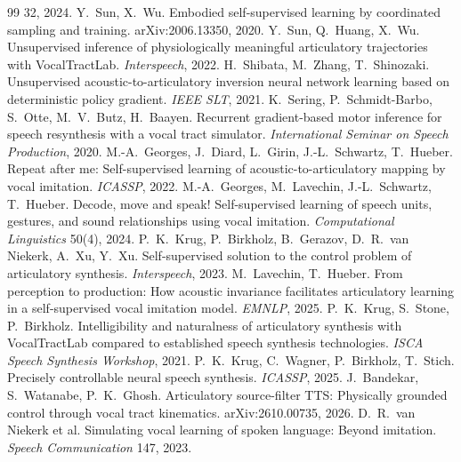 \documentclass[10pt,a4paper,twocolumn]{article}
\begin{document}
\begin{thebibliography}{99}
32, 2024.
 Y.~Sun, X.~Wu. Embodied self-supervised learning by coordinated sampling and
training. arXiv:2006.13350, 2020.
 Y.~Sun, Q.~Huang, X.~Wu. Unsupervised inference of physiologically meaningful
articulatory trajectories with VocalTractLab. \emph{Interspeech}, 2022.
 H.~Shibata, M.~Zhang, T.~Shinozaki. Unsupervised acoustic-to-articulatory
inversion neural network learning based on deterministic policy gradient. \emph{IEEE SLT},
2021.
 K.~Sering, P.~Schmidt-Barbo, S.~Otte, M.~V.~Butz, H.~Baayen. Recurrent
gradient-based motor inference for speech resynthesis with a vocal tract simulator.
\emph{International Seminar on Speech Production}, 2020.
 M.-A.~Georges, J.~Diard, L.~Girin, J.-L.~Schwartz, T.~Hueber. Repeat after
me: Self-supervised learning of acoustic-to-articulatory mapping by vocal imitation.
\emph{ICASSP}, 2022.
 M.-A.~Georges, M.~Lavechin, J.-L.~Schwartz, T.~Hueber. Decode, move and
speak! Self-supervised learning of speech units, gestures, and sound relationships using vocal
imitation. \emph{Computational Linguistics} 50(4), 2024.
 P.~K.~Krug, P.~Birkholz, B.~Gerazov, D.~R.~van Niekerk, A.~Xu, Y.~Xu.
Self-supervised solution to the control problem of articulatory synthesis. \emph{Interspeech},
2023.
 M.~Lavechin, T.~Hueber. From perception to production: How acoustic
invariance facilitates articulatory learning in a self-supervised vocal imitation model.
\emph{EMNLP}, 2025.
 P.~K.~Krug, S.~Stone, P.~Birkholz. Intelligibility and naturalness of
articulatory synthesis with VocalTractLab compared to established speech synthesis
technologies. \emph{ISCA Speech Synthesis Workshop}, 2021.
 P.~K.~Krug, C.~Wagner, P.~Birkholz, T.~Stich. Precisely controllable neural
speech synthesis. \emph{ICASSP}, 2025.
 J.~Bandekar, S.~Watanabe, P.~K.~Ghosh. Articulatory source-filter TTS:
Physically grounded control through vocal tract kinematics. arXiv:2610.00735, 2026.
 D.~R.~van Niekerk et al. Simulating vocal learning of spoken language: Beyond
imitation. \emph{Speech Communication} 147, 2023.
\end{thebibliography}
\end{document}
